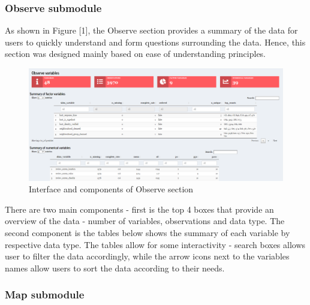 \documentclass{acm_proc_article-sp}
\begin{document}
\hypertarget{observe-submodule}{%
\subsubsection{Observe submodule}\label{observe-submodule}}

As shown in Figure {[}1{]}, the Observe section provides a summary of
the data for users to quickly understand and form questions surrounding
the data. Hence, this section was designed mainly based on ease of
understanding principles.

\begin{figure}[H]

{\centering \includegraphics[width=1\linewidth]{images/design_observe} 

}

\caption{Interface and components of Observe section}\label{fig:unnamed-chunk-1}
\end{figure}

There are two main components - first is the top 4 boxes that provide an
overview of the data - number of variables, observations and data type.
The second component is the tables below shows the summary of each
variable by respective data type. The tables allow for some
interactivity - search boxes allows user to filter the data accordingly,
while the arrow icons next to the variables names allow users to sort
the data according to their needs.

\hypertarget{map-submodule}{%
\subsubsection{Map submodule}\label{map-submodule}}
\end{document}
